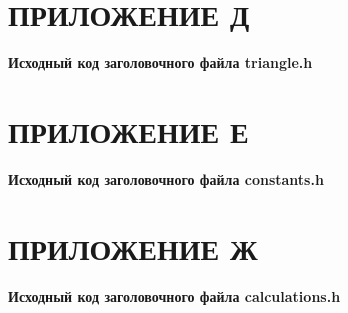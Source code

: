 \documentclass[14pt]{extarticle}
\begin{document}
{
    {
        \par
        \centering\section{ПРИЛОЖЕНИЕ Д}
        \par
    }
    \par
    {
        \par
        \centering
        \textbf{
            Исходный код заголовочного файла triangle.h
        }
        \par
    }
    \par
    \vspace{1em}

    

    \par
    \vfill
    \newpage
}

{
    {
        \par
        \centering\section{ПРИЛОЖЕНИЕ Е}
        \par
    }
    \par
    {
        \par
        \centering
        \textbf{
            Исходный код заголовочного файла constants.h
        }
        \par
    }
    \par
    \vspace{1em}

    

    \par
    \vfill
    \newpage
}

{
    {
        \par
        \centering\section{ПРИЛОЖЕНИЕ Ж}
        \par
    }
    \par
    {
        \par
        \centering
        \textbf{
            Исходный код заголовочного файла calculations.h
        }
        \par
    }
    \par
    \vspace{1em}

    

    \par
    \vfill
    \newpage
}
\end{document}
